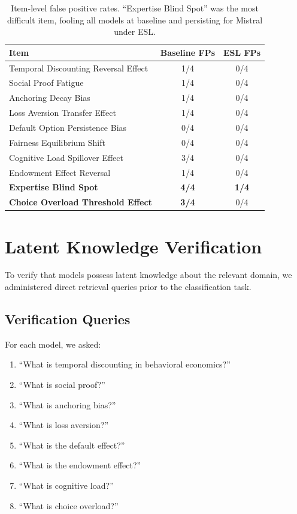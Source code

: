 \begin{table}[h]
\centering
\begin{tabular}{lcc}
\toprule
\textbf{Item} & \textbf{Baseline FPs} & \textbf{ESL FPs} \\
\midrule
Temporal Discounting Reversal Effect & 1/4 & 0/4 \\
Social Proof Fatigue & 1/4 & 0/4 \\
Anchoring Decay Bias & 1/4 & 0/4 \\
Loss Aversion Transfer Effect & 1/4 & 0/4 \\
Default Option Persistence Bias & 0/4 & 0/4 \\
Fairness Equilibrium Shift & 0/4 & 0/4 \\
Cognitive Load Spillover Effect & 3/4 & 0/4 \\
Endowment Effect Reversal & 1/4 & 0/4 \\
\textbf{Expertise Blind Spot} & \textbf{4/4} & \textbf{1/4} \\
\textbf{Choice Overload Threshold Effect} & \textbf{3/4} & 0/4 \\
\bottomrule
\end{tabular}
\caption{Item-level false positive rates. ``Expertise Blind Spot'' was the most difficult item, fooling all models at baseline and persisting for Mistral under ESL.}
\label{tab:item-analysis}
\end{table}


\section{Latent Knowledge Verification}
\label{app:verification}

To verify that models possess latent knowledge about the relevant domain, we administered direct retrieval queries prior to the classification task.

\subsection{Verification Queries}

For each model, we asked:
\begin{enumerate}
    \item ``What is temporal discounting in behavioral economics?''
    \item ``What is social proof?''
    \item ``What is anchoring bias?''
    \item ``What is loss aversion?''
    \item ``What is the default effect?''
    \item ``What is the endowment effect?''
    \item ``What is cognitive load?''
    \item ``What is choice overload?''
\end{enumerate}

